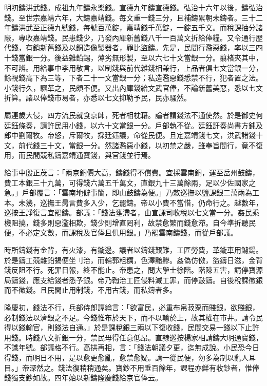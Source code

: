 明初鑄洪武錢。成祖九年鑄永樂錢。宣德九年鑄宣德錢。弘治十六年以後，鑄弘治錢。至世宗嘉靖六年，大鑄嘉靖錢。每文重一錢三分，且補鑄累朝未鑄者。三十二年鑄洪武至正德九號錢，每號百萬錠，嘉靖錢千萬錠，一錠五千文。而稅課抽分諸廠，專收嘉靖錢。民患錢少，乃發內庫新舊錢八千一百萬文折給俸糧。又令通行歷代錢，有銷新舊錢及以銅造像製器者，罪比盜鑄。先是，民間行濫惡錢，率以三四十錢當銀一分。後益雜鉛錫，薄劣無形製，至以六七十文當銀一分。翦楮夾其中，不可辨。用給事中李用敬言，以制錢與前代雜錢相兼行，上品者俱七文當銀一分，餘視錢高下為三等，下者二十一文當銀一分；私造濫惡錢悉禁不行，犯者置之法。小錢行久，驟革之，民頗不便。又出內庫錢給文武官俸，不論新舊美惡，悉以七文折算。諸以俸錢市易者，亦悉以七文抑勒予民，民亦騷然。

屬連歲大侵，四方流民就食京師，死者相枕藉。論者謂錢法不通使然。於是御史何廷鈺條奏，請許民用小錢，以六十文當銀一分。戶部執不從。廷鈺訐奏尚書方鈍及郎中劉爾牧。帝怒，斥爾牧，採廷鈺議，命從民便。且定嘉靖錢七文，洪武諸錢十文，前代錢三十文，當銀一分。然諸濫惡小錢，以初禁之嚴，雖奉旨間行，竟不復用，而民間競私鑄嘉靖通寶錢，與官錢並行焉。

給事中殷正茂言：「兩京銅價大高，鑄錢得不償費。宜採雲南銅，運至岳州鼓鑄，費工本銀三十九萬，可得錢六萬五千萬文，直銀九十三萬餘兩，足以少佐國家之急。」戶部覆言：「雲南地僻事簡，即山鼓鑄為便。」乃敕巡撫以鹽課銀二萬兩為工本。未幾，巡撫王昺言費多入少，乞罷鑄。帝以小費不當惜，仍命行之。越數年，巡按王諍復言宜罷鑄。部議：「錢法壅滯者，由宣課司收稅以七文當一分。姦民乘機阻撓，錢多則惡濫相欺，錢少則增直罔利，故禁愈繁而錢愈滯。自今準折聽民便，不必定文數，而課稅及官俸且俱用銀。」乃罷雲南鑄錢，而從戶部議。

時所鑄錢有金背，有火漆，有鏇邊。議者以鑄錢艱難，工匠勞費，革鏇車用鑢鐋。於是鑄工競雜鉛錫便坐刂治，而輪郭粗糲，色澤黯黲。姦偽仿傚，盜鑄日滋，金背錢反阻不行。死罪日報，終不能止。帝患之，問大學士徐階。階陳五害，請停寶源局鑄錢，應支給錢者悉予銀。帝乃鞫治工匠侵料減工罪，而停鼓鑄。自後稅課徵銀而不徵錢。且民間止用制錢，不用古錢，而私鑄者多。

隆慶初，錢法不行，兵部侍郎譚綸言：「欲富民，必重布帛菽粟而賤銀，欲賤銀，必制錢法以濟銀之不足。今錢惟布於天下，而不以輸於上，故其權在市井。請令民得以錢輸官，則錢法自通。」於是課稅銀三兩以下復收錢，民間交易一錢以下止許用錢。時錢八文折銀一分，禁民毋得任意低昂。直隸巡按楊家相請鑄大明通寶錢，不識年號。部議格不行。高拱再相，言：「錢法朝議夕更，迄無成說。小民恐今日得錢，而明日不用，是以愈更愈亂，愈禁愈疑。請一從民便，勿多為制以亂人耳目。」帝深然之。錢法復稍稍通矣。寶鈔不用垂百餘年，課程亦鮮有收鈔者，惟俸錢獨支鈔如故。四年始以新鑄隆慶錢給京官俸云。

